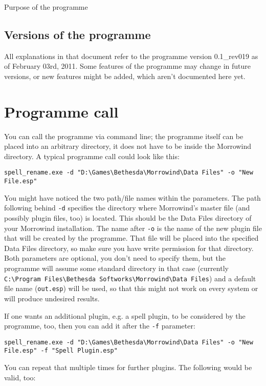 \documentclass[12pt,oneside,a4paper]{article}
\begin{document}
\begin{section}{Purpose of the programme}
\subsection{Versions of the programme}
All explanations in that document refer to the programme version 0.1\_rev019 as
of February 03rd, 2011. Some features of the programme may change in future
versions, or new features might be added, which aren't documented here yet.
\end{section}

\section{Programme call}
You can call the programme via command line; the programme itself can be placed
into an arbitrary directory, it does not have to be inside the Morrowind
directory. A typical programme call could look like this:

\texttt{spell\_rename.exe -d "D:\textbackslash{}Games\textbackslash{}Bethesda\textbackslash{}Morrowind\textbackslash{}Data Files" -o "New File.esp"}

You might have noticed the two path\slash file names within the parameters.
The path following behind \texttt{-d} specifies the directory where Morrowind's
master file (and possibly plugin files, too) is located. This should be the
Data Files directory of your Morrowind installation.
The name after \texttt{-o} is the name of the new plugin file that will be
created by the programme. That file will be placed into the specified Data
Files directory, so make sure you have write permission for that directory.
Both parameters are optional, you don't need to specify them, but the programme
will assume some standard directory in that case (currently \texttt{C:\textbackslash{}Program Files\textbackslash{}Bethesda Softworks\textbackslash{}Morrowind\textbackslash{}Data Files})
and a default file name (\texttt{out.esp}) will be used, so that this might not
work on every system or will produce undesired results.

If one wants an additional plugin, e.g. a spell plugin, to be considered by the
programme, too, then you can add it after the \texttt{-f} parameter:

\texttt{spell\_rename.exe -d "D:\textbackslash{}Games\textbackslash{}Bethesda\textbackslash{}Morrowind\textbackslash{}Data Files" -o "New File.esp" -f "Spell Plugin.esp"}

You can repeat that multiple times for further plugins.
The following would be valid, too:
\end{document}
